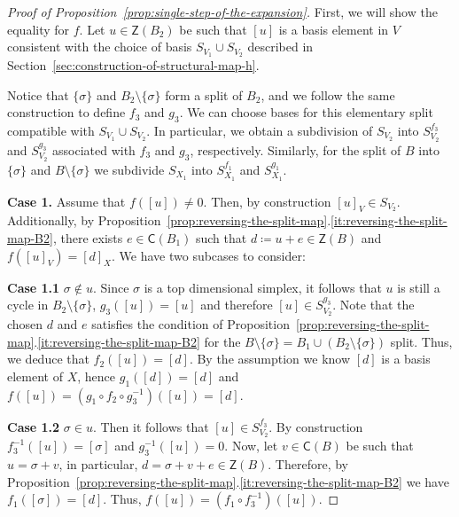 \documentclass[letterpaper,11pt]{article}
\theoremstyle{plain}
\theoremstyle{definition}
\newcounter{li}
\newcommand{\Zgroup}{\mathsf{Z}}
\newcommand{\Cgroup}{\mathsf{C}}
\newcommand\michal[1]{\textcolor{ForestGreen}{[ML: #1]}}
\begin{document}
\begin{proof}[Proof of Proposition~\ref{prop:single-step-of-the-expansion}]
    First, we will show the equality for $f$. 
    Let $u\in\Zgroup(B_2)$ be such that $[u]$ is a basis element in $V$ consistent with the choice of basis $S_{V_1}\cup S_{V_2}$ described in Section~\ref{sec:construction-of-structural-map-h}.
    
    Notice that $\{\sigma\}$ and $B_2\setminus\{\sigma\}$ form a split of $B_2$, 
        and we follow the same construction to define $f_3$ and $g_3$.
    We can choose bases for this elementary split compatible with $S_{V_1}\cup S_{V_2}$.
    In particular, we obtain a subdivision of $S_{V_2}$ into $S_{V_2}^{f_3}$ and $S_{V_2}^{g_3}$ associated with $f_3$ and $g_3$, respectively.
    Similarly, for the split of $B$ into $\{\sigma\}$ and $B\setminus\{\sigma\}$ we subdivide $S_{X_1}$ into $S_{X_1}^{f_1}$ and $S_{X_1}^{g_1}$.
    
    \textbf{Case 1.} 
        Assume that $f([u])\neq 0$.
        Then, by construction $[u]_{V}\in S_{V_2}$.
        Additionally, by Proposition~\ref{prop:reversing-the-split-map}.\ref{it:reversing-the-split-map-B2}, 
            there exists $e\in\Cgroup(B_1)$ such that 
            $d\coloneqq u+e\in\Zgroup(B)$ and $f([u]_{V})=[d]_X$.
        We have two subcases to consider:
        
    \textbf{Case 1.1} 
        $\sigma\not\in u$.
        Since $\sigma$ is a top dimensional simplex, 
            it follows that $u$ is still a cycle in $B_2\setminus\{\sigma\}$,
            $g_3([u])=[u]$ and therefore $[u]\in S_{V_2}^{g_3}$.
        Note that the chosen $d$ and $e$ satisfies the condition of Proposition~\ref{prop:reversing-the-split-map}.\ref{it:reversing-the-split-map-B2} for the $B\setminus\{\sigma\}=B_1\cup(B_2\setminus\{\sigma\})$ split.
        Thus, we deduce that $f_2([u])=[d]$.
        By the assumption we know $[d]$ is a basis element of $X$,  %
            hence $g_1([d])=[d]$ and $f([u])=(g_1\circ f_2\circ g_3^{-1})([u])=[d]$.
        
    \textbf{Case 1.2}
        $\sigma\in u$.
        Then it follows that $[u]\in S_{V_2}^{f_3}$.
        By construction $f_3^{-1}([u])=[\sigma]$ and $g_3^{-1}([u])=0$.
        Now, let $v\in\Cgroup(B)$ be such that $u=\sigma+v$, in particular, 
            $d=\sigma+v+e\in\Zgroup(B)$.
        Therefore, by Proposition~\ref{prop:reversing-the-split-map}.\ref{it:reversing-the-split-map-B2} we have $f_1([\sigma])=[d]$.
        Thus, $f([u])=(f_1\circ f_3^{-1})([u])$.
        

\end{proof}
\end{document}
